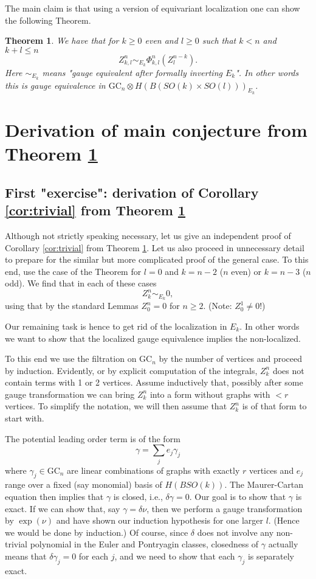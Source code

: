\documentclass[a4paper]{amsart}
\theoremstyle{plain}
\newtheorem{thm}{Theorem}
\theoremstyle{definition}
\newcommand{\GC}{\mathrm{GC}}
\newcommand{\SO}{\mathit{SO}}
\begin{document}
The main claim is that using a version of equivariant localization one can show the following Theorem.
\begin{thm}\label{thm:locmain}\label{thm:mainloc}
We have that for $k\geq 0$ even and $l\geq 0$ such that $k<n$ and $k+l\leq n$
\[
Z_{k,l}^n \sim_{E_k} \Phi_{k,l}^n (Z_{l}^{n-k}).
\]
Here $\sim_{E_k}$ means "gauge equivalent after formally inverting $E_k$". In other words this is gauge equivalence in 
$\GC_n\otimes H(B(\SO(k)\times \SO(l)))_{E_k}$.
\end{thm}

\section{Derivation of main conjecture from Theorem \ref{thm:locmain} }

\subsection{First "exercise": derivation of Corollary \ref{cor:trivial} from Theorem \ref{thm:locmain}}
Although not strictly speaking necessary, let us give an independent proof of Corollary \ref{cor:trivial} from Theorem \ref{thm:locmain}. Let us also proceed in unnecessary detail to prepare for the similar but more complicated proof of the general case.
To this end, use the case of the Theorem for $l=0$ and $k=n-2$ ($n$ even) or $k=n-3$ ($n$ odd).
 We find that in each of these cases
 \[
 Z_{k}^n \sim_{E_k} 0,
 \]
 using that by the standard Lemmas $Z_0^n=0$ for $n \geq 2$. (Note: $Z_0^1\neq 0$!)
 
Our remaining task is hence to get rid of the localization in $E_k$. In other words we want to show that the localized gauge equivalence implies the non-localized.

To this end we use the filtration on $\GC_n$ by the number of vertices and proceed by induction.
Evidently, or by explicit computation of the integrals, $Z_{k}^n$ does not contain terms with 1 or 2 vertices.
Assume inductively that, possibly after some gauge transformation we can bring $Z_{k}^n$ into a form without graphs with $< r$ vertices. To simplify the notation, we will then assume that $Z_{k}^n$ is of that form to start with.

The potential leading order term is of the form 
\[
\gamma = \sum_j e_j \gamma_j
\]
where $\gamma_j\in \GC_n$ are linear combinations of graphs with exactly $r$ vertices and $e_j$ range over a fixed (say monomial) basis of $H(B\SO(k))$.
The Maurer-Cartan equation then implies that $\gamma$ is closed, i.e., $\delta \gamma=0$. Our goal is to show that $\gamma$ is exact. If we can show that, say $\gamma=\delta \nu$, then we perform a gauge transformation by $\exp(\nu)$ and have shown our induction hypothesis for one larger $l$. (Hence we would be done by induction.)
Of course, since $\delta$ does not involve any non-trivial polynomial in the Euler and Pontryagin classes, closedness of $\gamma$ actually means that $\delta \gamma_j=0$ for each $j$, and we need to show that each $\gamma_j$ is separately exact.
\end{document}
